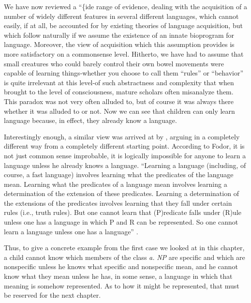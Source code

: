 We have now reviewed a ``\{ide range of evidence, dealing with the
acquisition of a number of widely different features in several different languages, which cannot easily, if at all, be accounted for by existing theories of language acquisition, but which follow naturally if we assume the existence of an innate bioprogram for language. Moreover, the view of acquisition which this assumption provides is more satisfactory on a commonsense level. Hitherto, we have had to assume that small creatures who could barely control their own bowel movements were capable of learning things-whether you choose to call them ``rules'' or ``behavior'' is quite irrelevant at this level{}-of such abstractness and complexity that when brought to the level of consciousness, mature scholars often misanalyze them. This paradox was not very often alluded to, but of course it was always there whether it was alluded to or not. Now we can see that children can only learn language because, in effect, they already know a language.

Interestingly enough, a similar view was arrived at by \citet{Fodor1975}, arguing in a completely different way from a completely different starting point. According to Fodor, it is not just common sense improbable, it is logically impossible for anyone to learn a language unless he already knows a language. ``Learning a language (includ\-ing, of course, a fast language) involves learning what the predicates of the language mean. Learning what the predicates of a language mean involves learning a determination of the extension of these predicates. Learning a determination of the extensions of the predicates involves learning that they fall under certain rules (i.e., truth rules). But one cannot learn that (P)redicate falls under (R)ule unless one has a lan\-guage in which P and R can be represented. So one cannot learn a language unless one has a language'' \citep[63-64]{Fodor1975}.

Thus, to give a concrete example from the first case we looked at in this chapter, a child cannot know which members of the class
\textit{a.} \textit{NP} are specific and which are nonspecific unless he knows what specific and nonspecific mean, and he cannot know what they mean unless he has, in some sense, a language in which that meaning is some\-how represented. As to how it might be represented, that must be
reserved for the next chapter.



